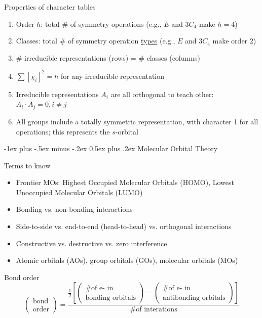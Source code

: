 \documentclass[10pt,landscape]{article}
\makeatletter
\renewcommand{\section}{\@startsection{section}{1}{0mm}%
                                {-1ex plus -.5ex minus -.2ex}%
                                {0.5ex plus .2ex}%
                                {\normalfont\large\bfseries}}
\makeatother
\begin{document}
\begin{multicols}{3}
Properties of character tables
\begin{enumerate}
	\item Order $h$: total \# of symmetry operations (e.g., $E$ and $3C_4$ make $h=4$)
	\item  Classes: total \# of symmetry operation \underline{types} (e.g., $E$ and $3C_4$ make order 2)
	\item \# irreducible representations (rows) = \# classes (columns)
	\item $\sum [\chi_i ]^2 = h$ for any irreducible representation
	\item Irreducible representations $A_i$ are all orthogonal to teach other: ${A_i} \cdot {A_j} = 0, i\neq j$ 
	\item All groups include a totally symmetric representation, with character 1 for all operations; this represents the $s$-orbital
\end{enumerate}

\hrulefill

\section{Molecular Orbital Theory}

Terms to know
\begin{itemize}
	\item Frontier MOs: Highest Occupied Molecular Orbitals (HOMO),  Lowest Unoccupied Molecular Orbitals (LUMO)
	\item Bonding vs. non-bonding interactions
	\item Side-to-side vs. end-to-end (head-to-head) vs. orthogonal interactions
	\item Constructive vs. destructive vs. zero interference
	\item Atomic orbitals (AOs), group orbitals (GOs), molecular orbitals (MOs)
\end{itemize}


Bond order
\[
\begin{pmatrix}
	\text{bond} \\
	\text{order} 
\end{pmatrix}
= 
\frac{
	\frac{1}{2}
	\left[
		\begin{pmatrix}
			\text{\# of e- in } \\
			\text{bonding orbitals} 
		\end{pmatrix}
		-
		\begin{pmatrix}
			\text{\# of e- in } \\
			\text{antibonding orbitals} 
		\end{pmatrix}
	\right]
}{\text{\# of interations}}
\]


\end{multicols}
\end{document}
